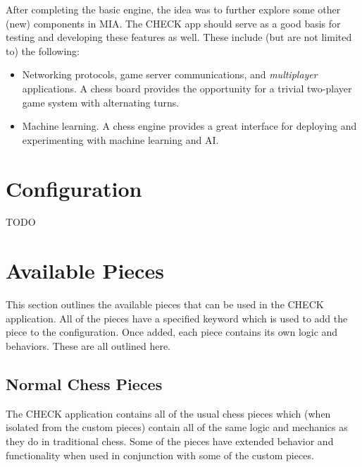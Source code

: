 After completing the basic engine, the idea was to further explore some other (new) components in MIA. The CHECK app should serve as a good basis for testing and developing these features as well. These include (but are not limited to) the following:
\begin{itemize}\itemsep0em
	\item Networking protocols, game server communications, and \textit{multiplayer} applications. A chess board provides the opportunity for a trivial two-player game system with alternating turns.
	\item Machine learning. A chess engine provides a great interface for deploying and experimenting with machine learning and AI.
\end{itemize}











\section{Configuration}\label{section:check_configuration}

TODO



















\section{Available Pieces}\label{section:check_available_pieces}

This section outlines the available pieces that can be used in the CHECK application. All of the pieces have a specified keyword which is used to add the piece to the configuration. Once added, each piece contains its own logic and behaviors. These are all outlined here.

\subsection{Normal Chess Pieces}\label{section:check_normal_pieces}

The CHECK application contains all of the usual chess pieces which (when isolated from the custom pieces) contain all of the same logic and mechanics as they do in traditional chess. Some of the pieces have extended behavior and functionality when used in conjunction with some of the custom pieces.

